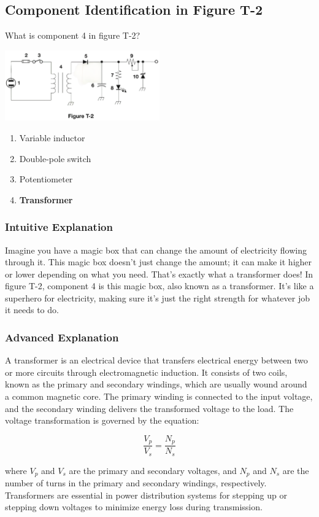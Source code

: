 \subsection{Component Identification in Figure T-2}
\label{T6C09}

\begin{tcolorbox}[colback=gray!10!white,colframe=black!75!black,title=T6C09]
What is component 4 in figure T-2?

\includegraphics[width=0.5\textwidth]{tech/images/t2.png} 

\begin{enumerate}[label=\Alph*)]
    \item Variable inductor
    \item Double-pole switch
    \item Potentiometer
    \item \textbf{Transformer}
\end{enumerate}
\end{tcolorbox}

\subsubsection{Intuitive Explanation}
Imagine you have a magic box that can change the amount of electricity flowing through it. This magic box doesn’t just change the amount; it can make it higher or lower depending on what you need. That’s exactly what a transformer does! In figure T-2, component 4 is this magic box, also known as a transformer. It’s like a superhero for electricity, making sure it’s just the right strength for whatever job it needs to do.

\subsubsection{Advanced Explanation}
A transformer is an electrical device that transfers electrical energy between two or more circuits through electromagnetic induction. It consists of two coils, known as the primary and secondary windings, which are usually wound around a common magnetic core. The primary winding is connected to the input voltage, and the secondary winding delivers the transformed voltage to the load. The voltage transformation is governed by the equation:

\[
\frac{V_p}{V_s} = \frac{N_p}{N_s}
\]

where \( V_p \) and \( V_s \) are the primary and secondary voltages, and \( N_p \) and \( N_s \) are the number of turns in the primary and secondary windings, respectively. Transformers are essential in power distribution systems for stepping up or stepping down voltages to minimize energy loss during transmission.

